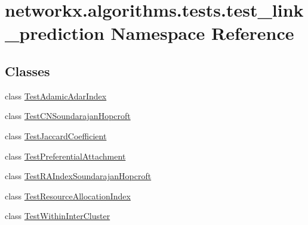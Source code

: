\hypertarget{namespacenetworkx_1_1algorithms_1_1tests_1_1test__link__prediction}{}\section{networkx.\+algorithms.\+tests.\+test\+\_\+link\+\_\+prediction Namespace Reference}
\label{namespacenetworkx_1_1algorithms_1_1tests_1_1test__link__prediction}
\subsection*{Classes}
\begin{DoxyCompactItemize}
\item 
class \hyperlink{classnetworkx_1_1algorithms_1_1tests_1_1test__link__prediction_1_1TestAdamicAdarIndex}{Test\+Adamic\+Adar\+Index}
\item 
class \hyperlink{classnetworkx_1_1algorithms_1_1tests_1_1test__link__prediction_1_1TestCNSoundarajanHopcroft}{Test\+C\+N\+Soundarajan\+Hopcroft}
\item 
class \hyperlink{classnetworkx_1_1algorithms_1_1tests_1_1test__link__prediction_1_1TestJaccardCoefficient}{Test\+Jaccard\+Coefficient}
\item 
class \hyperlink{classnetworkx_1_1algorithms_1_1tests_1_1test__link__prediction_1_1TestPreferentialAttachment}{Test\+Preferential\+Attachment}
\item 
class \hyperlink{classnetworkx_1_1algorithms_1_1tests_1_1test__link__prediction_1_1TestRAIndexSoundarajanHopcroft}{Test\+R\+A\+Index\+Soundarajan\+Hopcroft}
\item 
class \hyperlink{classnetworkx_1_1algorithms_1_1tests_1_1test__link__prediction_1_1TestResourceAllocationIndex}{Test\+Resource\+Allocation\+Index}
\item 
class \hyperlink{classnetworkx_1_1algorithms_1_1tests_1_1test__link__prediction_1_1TestWithinInterCluster}{Test\+Within\+Inter\+Cluster}
\end{DoxyCompactItemize}

